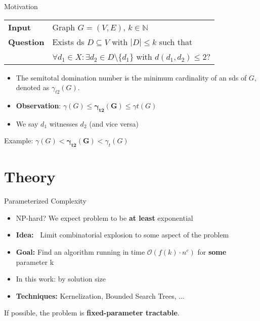 \begin{frame}[c]{Motivation}
\begin{tcolorbox}[colback=TUMBlueLighter,title=\sdom]
    \begin{tabularx}{1.0\textwidth}{>{\hsize=0.30\hsize}X>{\hsize=0.8\hsize}X}
        \textbf{Input}    & Graph $G = (V, E)$, $k \in \mathbb{N}$\\
        \textbf{Question} & Exists ds $D \subseteq V$ with $|D| \leq k$ such that  \\
        & $\forall d_1 \in X :\exists d_2 \in D \setminus \{d_1\}$ with ${d(d_1, d_2) \leq 2}$? \\
    \end{tabularx}
\end{tcolorbox}

\begin{itemize}
    \pause \item The semitotal domination number is the minimum cardinality of an sds of $G$, denoted as $\gamma_{t2}(G)$.
    \pause \item \textbf{Observation}: $\gamma(G) \leq  \mathbf{\gamma_{t2}(G)}  \leq \gamma{t}(G)$
    \pause \item We say $d_1$ witnesses $d_2$ (and vice versa)
\end{itemize}
\end{frame}

\begin{frame}[c]{Example: $\gamma(G) < \mathbf{\gamma_{t2}(G)} < \gamma_t(G)$}
\begin{figure}[!ht]
    \end{figure}
\end{frame}

\section{Theory}
\begin{frame}[c]{Parameterized Complexity}
    \begin{itemize}
        \pause \item NP-hard? We expect problem to be  \textbf{at least} exponential \\
        \pause \item \textbf{Idea:~} Limit combinatorial explosion to some aspect of the problem\\
        \pause \item \textbf{Goal: } Find an algorithm running in time $\mathcal{O}(f(k) \cdot n^c)$ for \textbf{some} parameter k
        \pause \item In this work: by solution size
        \pause \item \textbf{Techniques: } Kernelization, Bounded Search Trees, ... 
    \end{itemize}

If possible, the problem is \textbf{fixed-parameter tractable}.

\end{frame}

